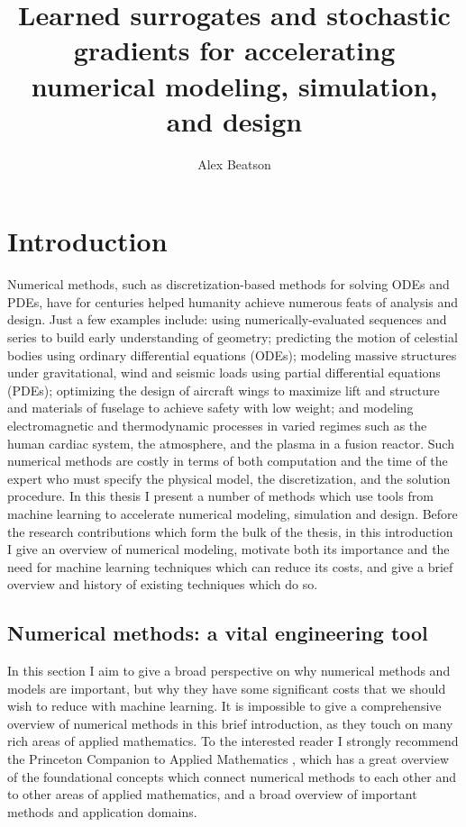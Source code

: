 \documentclass{puthesis}
\author{Alex Beatson}
\title{Learned surrogates and stochastic gradients for accelerating
numerical modeling, simulation, and design}
\begin{document}
\chapter{Introduction}
Numerical methods, such as discretization-based methods for solving ODEs and PDEs, have for centuries helped humanity achieve numerous feats of analysis and design.
Just a few examples include: using numerically-evaluated sequences and series to build
early understanding of geometry; predicting the motion of celestial bodies using
ordinary differential equations (ODEs);
modeling massive structures under gravitational, wind and seismic loads using partial differential equations (PDEs); optimizing the design of aircraft wings to maximize lift and structure and materials of fuselage to achieve safety with low weight; and modeling electromagnetic and thermodynamic processes in varied regimes such as the human cardiac system,
the atmosphere, and the plasma in a fusion reactor.
Such numerical methods are costly in terms of both computation and the time of the expert who must specify the physical model, the discretization, and the solution procedure.
In this thesis I present a number of methods which use tools from machine learning to accelerate numerical modeling, simulation and design.
Before the research contributions which form the bulk of the thesis,
in this introduction I give an overview of numerical modeling,
motivate both its importance and the need for machine learning techniques which can reduce its costs,
and give a brief overview and history of existing techniques which do so.

\section{Numerical methods: a vital engineering tool}
In this section I aim to give a broad perspective on why numerical methods and models
are important, but why they have some significant costs that we should wish to reduce
with machine learning.
It is impossible to give a comprehensive overview of numerical methods in this brief
introduction, as they touch on many rich areas of applied mathematics.
To the interested reader I strongly recommend the Princeton Companion to Applied
Mathematics \citep{higham2015princeton}, which has a great overview
of the foundational concepts which connect numerical methods to each other and
to other areas of applied mathematics, and a broad overview of important
methods and application domains.
\end{document}
